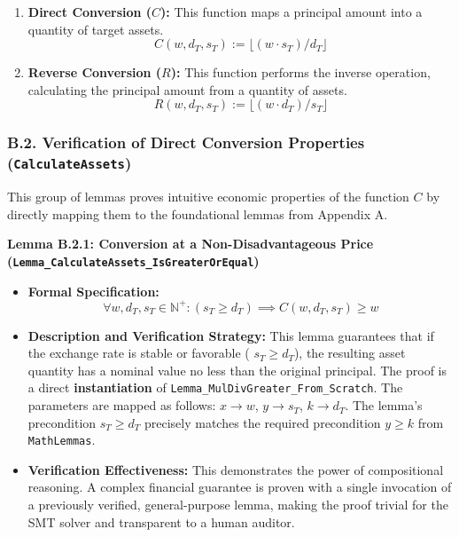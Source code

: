 \documentclass[
  english,
  onecolumn]{article}
\providecommand{\tightlist}{%
  \setlength{\itemsep}{0pt}\setlength{\parskip}{0pt}}
\begin{document}
\begin{enumerate}
\def\labelenumi{\arabic{enumi}.}
\item
  \textbf{Direct Conversion (\(C\)):} This function maps a principal
  amount into a quantity of target assets.
  \[ C(w, d_T, s_T) := \lfloor (w \cdot s_T) / d_T \rfloor \]
\item
  \textbf{Reverse Conversion (\(R\)):} This function performs the
  inverse operation, calculating the principal amount from a quantity of
  assets. \[ R(w, d_T, s_T) := \lfloor (w \cdot d_T) / s_T \rfloor \]
\end{enumerate}

\subsubsection{\texorpdfstring{B.2. Verification of Direct Conversion
Properties
(\texttt{CalculateAssets})}{B.2. Verification of Direct Conversion Properties (CalculateAssets)}}\label{b.2.-verification-of-direct-conversion-properties-calculateassets}

This group of lemmas proves intuitive economic properties of the
function \(C\) by directly mapping them to the foundational lemmas from
Appendix A.

\textbf{Lemma B.2.1: Conversion at a Non-Disadvantageous Price
(\texttt{Lemma\_CalculateAssets\_IsGreaterOrEqual})}

\begin{itemize}
\tightlist
\item
  \textbf{Formal Specification:}
  \[ \forall w, d_T, s_T \in \mathbb{N}^+ : (s_T \ge d_T) \implies C(w, d_T, s_T) \ge w \]
\item
  \textbf{Description and Verification Strategy:} This lemma guarantees
  that if the exchange rate is stable or favorable ( \(s_T \ge d_T\)),
  the resulting asset quantity has a nominal value no less than the
  original principal. The proof is a direct \textbf{instantiation} of
  \texttt{Lemma\_MulDivGreater\_From\_Scratch}. The parameters are
  mapped as follows: \(x \to w\), \(y \to s_T\), \(k \to d_T\). The
  lemma's precondition \(s_T \ge d_T\) precisely matches the required
  precondition \(y \ge k\) from \texttt{MathLemmas}.
\item
  \textbf{Verification Effectiveness:} This demonstrates the power of
  compositional reasoning. A complex financial guarantee is proven with
  a single invocation of a previously verified, general-purpose lemma,
  making the proof trivial for the SMT solver and transparent to a human
  auditor.
\end{itemize}
\end{document}
